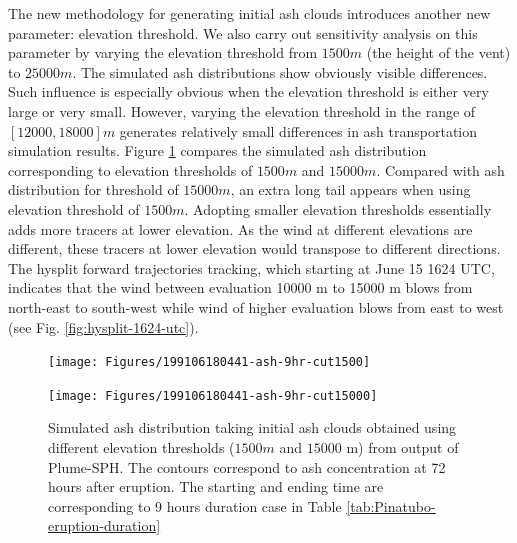 \documentclass[draft,linenumbers]{agujournal2019}
\begin{document}
The new methodology for generating initial ash clouds introduces another new parameter: elevation threshold. We also carry out sensitivity analysis on this parameter by varying the elevation threshold from $1500 m$ (the height of the vent) to $25000 m$. The simulated ash distributions show obviously visible differences. Such influence is especially obvious when the elevation threshold is either very large or very small. However, varying the elevation threshold in the range of $[12000, 18000] m$ generates relatively small differences in ash transportation simulation results. Figure \ref{fig:Puff-sensitivity-elevation-threshold} compares the simulated ash distribution corresponding to elevation thresholds of $1500 m$ and $15000 m$. Compared with ash distribution for threshold of $15000 m$, an extra long tail appears when using elevation threshold of $1500 m$. Adopting smaller elevation thresholds essentially adds more tracers at lower elevation. As the wind at different elevations are different, these tracers at lower elevation would transpose to different directions. The hysplit \citep{stein2015noaa, rolph2017real} forward trajectories tracking, which starting at June 15 1624 UTC, indicates that the wind between evaluation 10000 m to 15000 m blows from north-east to south-west while wind of higher evaluation blows from east to west (see Fig. \ref{fig:hysplit-1624-utc}).

\begin{figure}[!htb]
\centering
\begin{minipage}{.325\textwidth}
\centering
\texttt{[image: Figures/199106180441-ash-9hr-cut1500]}
\end{minipage}%
\begin{minipage}{.325 \textwidth}
\centering
\texttt{[image: Figures/199106180441-ash-9hr-cut15000]}
\end{minipage}%
\caption{Simulated ash distribution taking initial ash clouds obtained using different elevation thresholds ($1500 m$ and $15000$ m) from output of Plume-SPH. The contours correspond to ash concentration at 72 hours after eruption. The starting and ending time are corresponding to 9 hours duration case in Table \ref{tab:Pinatubo-eruption-duration}}
\label{fig:Puff-sensitivity-elevation-threshold}
\end{figure}
\end{document}
